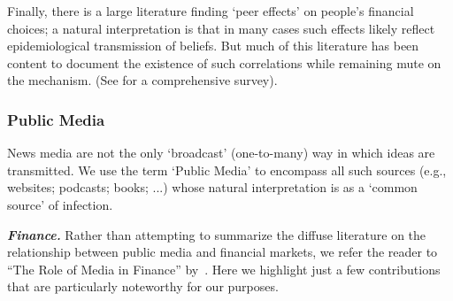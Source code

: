 
Finally, there is a large literature finding `peer effects' on people's financial choices; a natural interpretation is that in many cases such effects likely reflect epidemiological transmission of beliefs.  But much of this literature has been content to document the existence of such correlations while remaining mute on the mechanism.  (See \cite{kuchler2021social} for a comprehensive survey).



\subsubsection{Public Media}

News media are not the only `broadcast' (one-to-many) way in which ideas are transmitted.  We use the term `Public Media' to encompass all such sources (e.g., websites;  podcasts;  books; ...) whose natural interpretation is as a `common source' of infection.

\textbf{\textit{Finance.}}  Rather than attempting to summarize the diffuse literature on the relationship between public media and financial markets, we refer the reader to ``The Role of Media in Finance'' by~\cite{TETLOCK2015701}.  Here we highlight just a few contributions that are particularly noteworthy for our purposes. %

